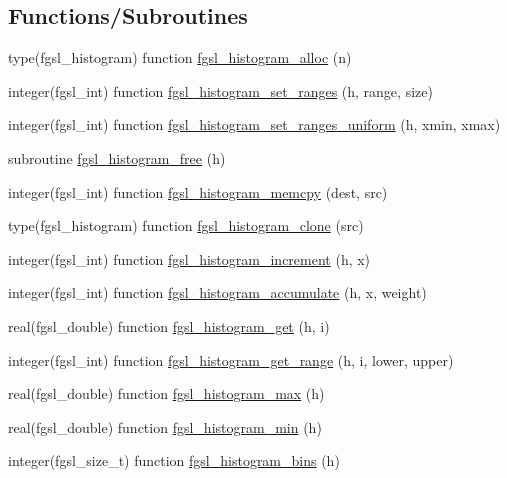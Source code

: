 \subsection*{Functions/\-Subroutines}
\begin{DoxyCompactItemize}
\item 
type(fgsl\-\_\-histogram) function \hyperlink{histogram_8finc_a75325ebef92592eba65abd29b6cfadc7}{fgsl\-\_\-histogram\-\_\-alloc} (n)
\item 
integer(fgsl\-\_\-int) function \hyperlink{histogram_8finc_a3d8e7578c7b72642e1d10dad2dca905c}{fgsl\-\_\-histogram\-\_\-set\-\_\-ranges} (h, range, size)
\item 
integer(fgsl\-\_\-int) function \hyperlink{histogram_8finc_a258b134c27c43ac2108a948c55cf54b7}{fgsl\-\_\-histogram\-\_\-set\-\_\-ranges\-\_\-uniform} (h, xmin, xmax)
\item 
subroutine \hyperlink{histogram_8finc_a34c352dbcdd897703aee1a66777208fe}{fgsl\-\_\-histogram\-\_\-free} (h)
\item 
integer(fgsl\-\_\-int) function \hyperlink{histogram_8finc_a67a6d98e7d1b4186a4b56131eb87bc3c}{fgsl\-\_\-histogram\-\_\-memcpy} (dest, src)
\item 
type(fgsl\-\_\-histogram) function \hyperlink{histogram_8finc_a5a9a45aebea2e21a98f95a561bbc0efe}{fgsl\-\_\-histogram\-\_\-clone} (src)
\item 
integer(fgsl\-\_\-int) function \hyperlink{histogram_8finc_ae8981d30687002aad3dce8c9a029e230}{fgsl\-\_\-histogram\-\_\-increment} (h, x)
\item 
integer(fgsl\-\_\-int) function \hyperlink{histogram_8finc_ac400179f5587a3dbf384fedd0651f354}{fgsl\-\_\-histogram\-\_\-accumulate} (h, x, weight)
\item 
real(fgsl\-\_\-double) function \hyperlink{histogram_8finc_adce52371beeafdc26321bc2c1aa2fcea}{fgsl\-\_\-histogram\-\_\-get} (h, i)
\item 
integer(fgsl\-\_\-int) function \hyperlink{histogram_8finc_a8095fb527d62852e016fec06e1aeeffd}{fgsl\-\_\-histogram\-\_\-get\-\_\-range} (h, i, lower, upper)
\item 
real(fgsl\-\_\-double) function \hyperlink{histogram_8finc_a27016b45c9d32860d6bea50edb523b9a}{fgsl\-\_\-histogram\-\_\-max} (h)
\item 
real(fgsl\-\_\-double) function \hyperlink{histogram_8finc_a703b22dce40bb880886ebed5a1e25269}{fgsl\-\_\-histogram\-\_\-min} (h)
\item 
integer(fgsl\-\_\-size\-\_\-t) function \hyperlink{histogram_8finc_a106c810b7ef3935d89ea6a2fda4f9ac2}{fgsl\-\_\-histogram\-\_\-bins} (h)

\end{DoxyCompactItemize}
